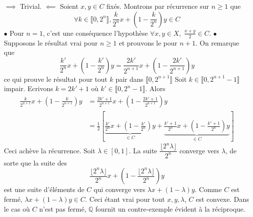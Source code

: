 \documentclass{report}
\begin{document}
\subsection{} \noindent{}\\ 
\\ 
\\
\noindent $\implies$ Trivial. \newline
$\impliedby$ Soient $x,y\in C$ fixés. Montrons par récurrence sur $n\geq 1$ que $$\forall k \in \llbracket 0,2^n \rrbracket,\frac{k}{2^n}x+ \left( 1-\frac{k}{2^n} \right)y\in C$$\newline \newline 
$\bullet$ Pour $n=1$, c'est une conséquence l'hypothèse $\forall x,y \in X, \; \frac{x+y}{2} \in C $. \newline
$\bullet$ Supposons le résultat vrai pour $n\geq 1$ et prouvons le pour $n+1$.\newline
On remarque que $$\frac{k'}{2^n}x+ \left( 1-\frac{k'}{2^n} \right)y =  \frac{2k'}{2^{n+1}}x+ \left( 1-\frac{2k'}{2^{n+1}} \right)y$$ ce qui prouve le résultat pour tout $k$ pair dans $\llbracket 0,2^{n+1} \rrbracket$\newline
Soit $k\in \llbracket 0,2^{n+1}-1 \rrbracket$ impair. Ecrivons $k=2k'+1$ où $k'\in \llbracket 0,2^n-1 \rrbracket$. Alors
$$ \begin{aligned}
\frac{k}{2^{n+1}}x+ \left( 1-\frac{k}{2^{n+1}} \right)y &= \frac{2k'+1}{2^{n+1}}x+ \left( 1-\frac{2k'+1}{2^{n+1}} \right)y\\
&= \frac{1}{2} \left[ \underbrace{\frac{k'}{2^n}x+ \left( 1-\frac{k'}{2^n} \right)y}_{\in C}  + \underbrace{\frac{k'+1}{2^n}x+ \left( 1-\frac{k'+1}{2^n} \right)y}_{\in C} \right]
\end{aligned}$$
Ceci achève la récurrence.\newline \newline
Soit $\lambda \in [0,1]$. La suite $\dfrac{\lfloor 2^n \lambda\rfloor}{2^n}$ converge vers $\lambda$, de sorte que la suite des $$\frac{\lfloor 2^n \lambda\rfloor}{2^n}x + \left(1- \frac{\lfloor 2^n \lambda\rfloor}{2^n}\right)y$$ est une suite d'éléments de $C$ qui converge vers $\lambda x +(1-\lambda)y$. Comme $C$ est fermé, $\lambda x +(1-\lambda)y\in C$. Ceci étant vrai pour tout $x,y,\lambda$, $C$ est convexe.\newline \newline
Dans le cas où $C$ n'est pas fermé, $\mathbb Q$ fournit un contre-exemple évident à la réciproque.
\end{document}
